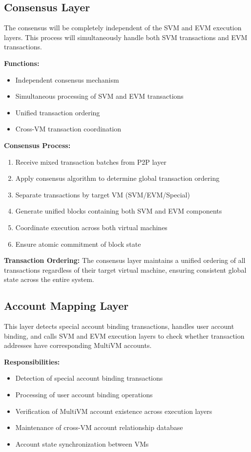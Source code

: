 \documentclass[11pt,a4paper]{article}
\begin{document}
\subsection{Consensus Layer}
The consensus will be completely independent of the SVM and EVM execution layers. This process will simultaneously handle both SVM transactions and EVM transactions.

\textbf{Functions:}
\begin{itemize}
    \item Independent consensus mechanism
    \item Simultaneous processing of SVM and EVM transactions
    \item Unified transaction ordering
    \item Cross-VM transaction coordination
\end{itemize}

\textbf{Consensus Process:}
\begin{enumerate}
    \item Receive mixed transaction batches from P2P layer
    \item Apply consensus algorithm to determine global transaction ordering
    \item Separate transactions by target VM (SVM/EVM/Special)
    \item Generate unified blocks containing both SVM and EVM components
    \item Coordinate execution across both virtual machines
    \item Ensure atomic commitment of block state
\end{enumerate}

\textbf{Transaction Ordering:}
The consensus layer maintains a unified ordering of all transactions regardless of their target virtual machine, ensuring consistent global state across the entire system.

\subsection{Account Mapping Layer}
This layer detects special account binding transactions, handles user account binding, and calls SVM and EVM execution layers to check whether transaction addresses have corresponding MultiVM accounts.

\textbf{Responsibilities:}
\begin{itemize}
    \item Detection of special account binding transactions
    \item Processing of user account binding operations
    \item Verification of MultiVM account existence across execution layers
    \item Maintenance of cross-VM account relationship database
    \item Account state synchronization between VMs
\end{itemize}
\end{document}
